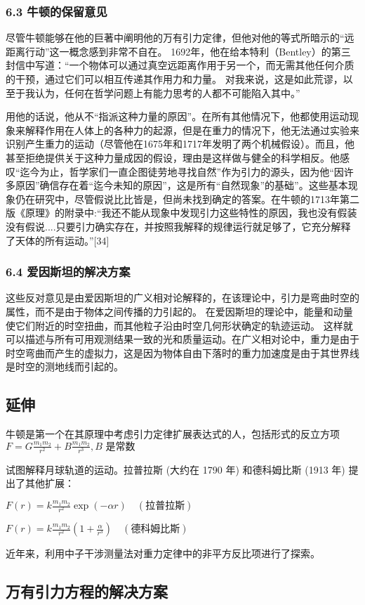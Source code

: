 \subsubsection{6.3 牛顿的保留意见}

尽管牛顿能够在他的巨著中阐明他的万有引力定律，但他对他的等式所暗示的“远距离行动”这一概念感到非常不自在。 1692年，他在给本特利（Bentley）的第三封信中写道：“一个物体可以通过真空远距离作用于另一个，而无需其他任何介质的干预，通过它们可以相互传递其作用力和力量。 对我来说，这是如此荒谬，以至于我认为，任何在哲学问题上有能力思考的人都不可能陷入其中。”

用他的话说，他从不“指派这种力量的原因”。在所有其他情况下，他都使用运动现象来解释作用在人体上的各种力的起源，但是在重力的情况下，他无法通过实验来识别产生重力的运动（尽管他在1675年和1717年发明了两个机械假设）。而且，他甚至拒绝提供关于这种力量成​​因的假设，理由是这样做与健全的科学相反。他感叹“迄今为止，哲学家们一直企图徒劳地寻找自然”作为引力的源头，因为他“因许多原因”确信存在着“迄今未知的原因”，这是所有“自然现象”的基础”。这些基本现象仍在研究中，尽管假说比比皆是，但尚未找到确定的答案。在牛顿的1713年第二版《原理》的附录中:“我还不能从现象中发现引力这些特性的原因，我也没有假装没有假说....只要引力确实存在，并按照我解释的规律运行就足够了，它充分解释了天体的所有运动。”[34]

\subsubsection{6.4 爱因斯坦的解决方案}

这些反对意见是由爱因斯坦的广义相对论解释的，在该理论中，引力是弯曲时空的属性，而不是由于物体之间传播的力引起的。 在爱因斯坦的理论中，能量和动量使它们附近的时空扭曲，而其他粒子沿由时空几何形状确定的轨迹运动。 这样就可以描述与所有可用观测结果一致的光和质量运动。在广义相对论中，重力是由于时空弯曲而产生的虚拟力，这是因为物体自由下落时的重力加速度是由于其世界线是时空的测地线而引起的。

\subsection{延伸}

牛顿是第一个在其原理中考虑引力定律扩展表达式的人，包括形式的反立方项
$F = G \frac{m_1 m_2}{r^2} + B \frac{m_1 m_2}{r^3} , B \text{ 是常数}$

试图解释月球轨道的运动。拉普拉斯 (大约在 1790 年) 和德科姆比斯 (1913 年) 提出了其他扩展：

$F(r) = k \frac{m_1 m_2}{r^2} \exp(-\alpha r) \quad (\text{拉普拉斯})$

$F(r) = k \frac{m_1 m_2}{r^2} \left(1 + \frac{\alpha}{r^3}\right) \quad (\text{德科姆比斯})$

近年来，利用中子干涉测量法对重力定律中的非平方反比项进行了探索。

\subsection{万有引力方程的解决方案}


